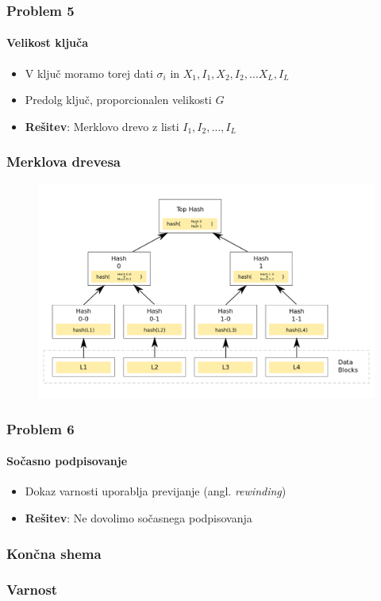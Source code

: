 \documentclass{beamer}    %
\begin{document}
\begin{frame}
    \frametitle{Problem 5}
    \framesubtitle{Velikost ključa}
    \begin{itemize}
        \item V ključ moramo torej dati $\sigma_i$ in $X_1, I_1, X_2, I_2, 
        \dots X_L, I_L$
        \item Predolg ključ, proporcionalen velikosti $G$
        \vspace{1cm}
        \item \textbf{Rešitev}: Merklovo drevo z listi $I_1, I_2, \dots, I_L$
    \end{itemize}  
\end{frame}

\begin{frame}
    \frametitle{Merklova drevesa}
    \begin{figure}
        \includegraphics[width=\textwidth]{images/merkle-tree.png}
    \end{figure}
\end{frame}

\begin{frame}
    \frametitle{Problem 6}
    \framesubtitle{Sočasno podpisovanje}
    \begin{itemize}
        \item Dokaz varnosti uporablja previjanje (angl. \textit{rewinding})
        \vspace{1cm}
        \item \textbf{Rešitev}: Ne dovolimo sočasnega podpisovanja
    \end{itemize}
\end{frame}

\begin{frame}
    \frametitle{Končna shema}
\end{frame}

\begin{frame}
    \frametitle{Varnost}
\end{frame}
\end{document}
